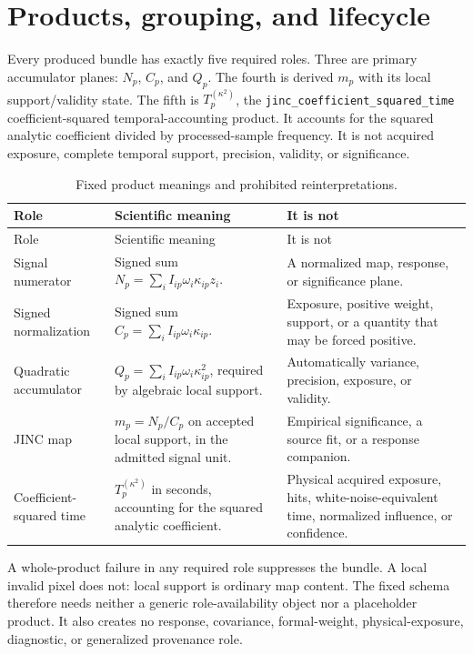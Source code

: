 \documentclass[11pt]{article}
\begin{document}
\section{Products, grouping, and lifecycle}
\label{sec:products-narrative}

Every produced bundle has exactly five required roles.  Three are primary
accumulator planes: $N_p$, $C_p$, and $Q_p$.  The fourth is derived $m_p$ with
its local support/validity state.  The fifth is
$T_p^{(\kappa^2)}$, the
\texttt{jinc\_coefficient\_squared\_time} coefficient-squared
temporal-accounting product.  It accounts for the squared analytic
coefficient divided by processed-sample frequency.  It
is not acquired exposure, complete temporal support, precision, validity, or
significance.

\begin{longtable}{@{}>{\raggedright\arraybackslash}p{}
                        >{\raggedright\arraybackslash}p{}
                        >{\raggedright\arraybackslash}p{}@{}}
\caption{Fixed product meanings and prohibited reinterpretations.}\label{tab:product-meanings}\\
\toprule
Role & Scientific meaning & It is not \\
\midrule
\endfirsthead
\toprule
Role & Scientific meaning & It is not \\
\midrule
\endhead
Signal numerator & Signed sum $N_p=\sum_i I_{ip}\omega_i\kappa_{ip}z_i$. & A
normalized map, response, or significance plane. \\
Signed normalization & Signed sum
$C_p=\sum_i I_{ip}\omega_i\kappa_{ip}$. & Exposure, positive weight, support,
or a quantity that may be forced positive. \\
Quadratic accumulator & $Q_p=\sum_i I_{ip}\omega_i\kappa_{ip}^2$, required by
algebraic local support. & Automatically variance, precision, exposure, or
validity. \\
JINC map & $m_p=N_p/C_p$ on accepted local support, in the admitted signal
unit. & Empirical significance, a source fit, or a response companion. \\
Coefficient-squared time & $T_p^{(\kappa^2)}$ in seconds, accounting for the
squared analytic coefficient. & Physical acquired exposure, hits,
white-noise-equivalent time, normalized influence, or confidence. \\
\bottomrule
\end{longtable}

A whole-product failure in any required role suppresses the bundle.  A local
invalid pixel does not: local support is ordinary map content.  The fixed
schema therefore needs neither a generic role-availability object nor a
placeholder product.  It also creates no response, covariance, formal-weight,
physical-exposure, diagnostic, or generalized provenance role.
\end{document}
